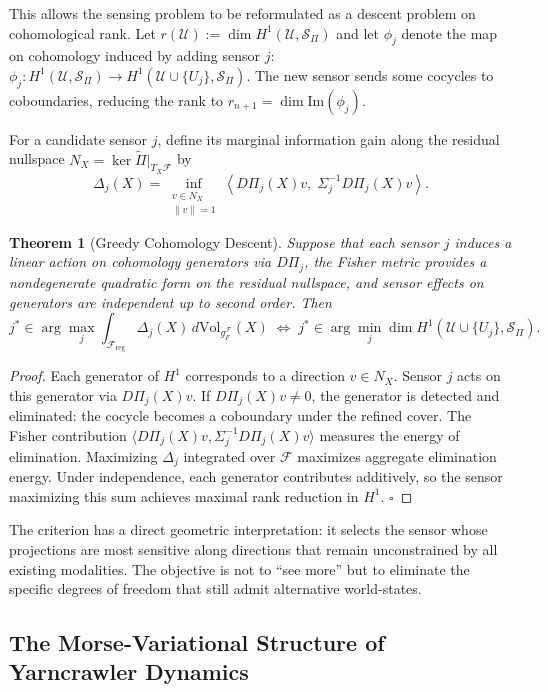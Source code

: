 \documentclass[11pt, oneside]{article}
\newtheorem{theorem}{Theorem}[section]
\newcommand{\Ftil}{\widetilde{\Pi}}
\begin{document}
This allows the sensing problem to be reformulated as a descent problem on cohomological
rank. Let $r(\mathcal{U}) := \dim H^1(\mathcal{U}, \mathcal{S}_\Pi)$ and let $\phi_j$
denote the map on cohomology induced by adding sensor $j$:
$\phi_j : H^1(\mathcal{U}, \mathcal{S}_\Pi) \to H^1(\mathcal{U} \cup \{U_j\}, \mathcal{S}_\Pi)$.
The new sensor sends some cocycles to coboundaries, reducing the rank to
$r_{n+1} = \dim \mathrm{Im}(\phi_j)$.

For a candidate sensor $j$, define its marginal information gain along the residual
nullspace $N_X = \ker \Ftil|_{T_X\mathcal{F}}$ by
\[
\Delta_j(X) = \inf_{\substack{v \in N_X \\ \|v\|=1}}
\left\langle D\Pi_j(X)v,\; \Sigma_j^{-1} D\Pi_j(X)v \right\rangle.
\]

\begin{theorem}[Greedy Cohomology Descent]
\label{thm:greedy_descent}
Suppose that each sensor $j$ induces a linear action on cohomology generators via
$D\Pi_j$, the Fisher metric provides a nondegenerate quadratic form on the residual
nullspace, and sensor effects on generators are independent up to second order. Then
\[
j^* \in \arg\max_j \int_{\mathcal{F}_{\mathrm{reg}}} \Delta_j(X)\,
d\mathrm{Vol}_{g_F^{\mathcal{F}}}(X)
\;\Longleftrightarrow\;
j^* \in \arg\min_j \dim H^1(\mathcal{U} \cup \{U_j\}, \mathcal{S}_\Pi).
\]
\end{theorem}

\begin{proof}
Each generator of $H^1$ corresponds to a direction $v \in N_X$. Sensor $j$ acts on this
generator via $D\Pi_j(X)v$. If $D\Pi_j(X)v \ne 0$, the generator is detected and
eliminated: the cocycle becomes a coboundary under the refined cover. The Fisher
contribution $\langle D\Pi_j(X)v, \Sigma_j^{-1} D\Pi_j(X)v\rangle$ measures the energy
of elimination. Maximizing $\Delta_j$ integrated over $\mathcal{F}$ maximizes aggregate
elimination energy. Under independence, each generator contributes additively, so the
sensor maximizing this sum achieves maximal rank reduction in $H^1$. $\square$
\end{proof}

The criterion has a direct geometric interpretation: it selects the sensor whose
projections are most sensitive along directions that remain unconstrained by all existing
modalities. The objective is not to ``see more'' but to eliminate the specific degrees of
freedom that still admit alternative world-states.

\subsection{The Morse-Variational Structure of Yarncrawler Dynamics}
\end{document}
